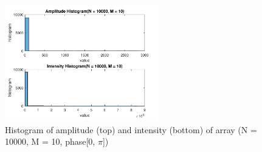 \documentclass{article}
\begin{document}
\begin{figure}[H]
	\centering
	\includegraphics[width = 0.6\textwidth]{src/pi/hist_10000_10.pdf}
	\caption{Histogram of amplitude (top) and intensity (bottom) of array (N = 10000, M = 10, phase[0, $\pi$])}
	\label{fig:hist-10000-10-pi}
\end{figure}
\end{document}
